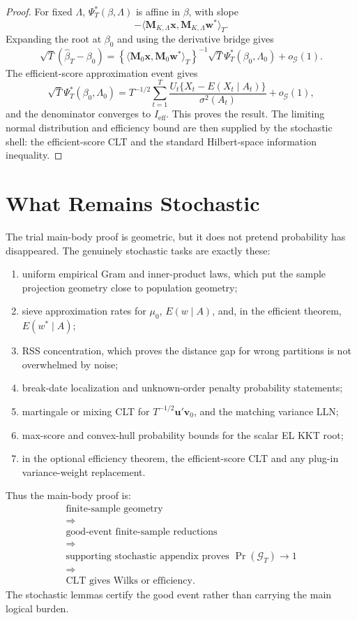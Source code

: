 \documentclass[12pt]{article}
\numberwithin{equation}{section}
\theoremstyle{definition}
\newcommand{\innerT}[2]{\langle #1,#2\rangle_T}
\begin{document}
\begin{proof}
For fixed \(\Lambda\), \(\Psi_T^*(\beta,\Lambda)\) is affine in \(\beta\), with
slope
\[
    -\innerT{\bm M_{K,\Lambda}\bm x}{\bm M_{K,\Lambda}\bm w^*}.
\]
Expanding the root at \(\beta_0\) and using the derivative bridge gives
\[
    \sqrt T(\widehat\beta_T-\beta_0)
    =\left\{\innerT{\bm M_0\bm x}{\bm M_0\bm w^*}\right\}^{-1}
      \sqrt T\Psi_T^*(\beta_0,\Lambda_0)+o_{\mathcal G}(1).
\]
The efficient-score approximation event gives
\[
    \sqrt T\Psi_T^*(\beta_0,\Lambda_0)
    =T^{-1/2}\sum_{t=1}^T
      \frac{U_t\{X_t-E(X_t\mid A_t)\}}{\sigma^2(A_t)}+o_{\mathcal G}(1),
\]
and the denominator converges to \(I_{\mathrm{eff}}\). This proves the result.
The limiting normal distribution and efficiency bound are then supplied by the
stochastic shell: the efficient-score CLT and the standard Hilbert-space
information inequality.
\end{proof}

\section{What Remains Stochastic}

The trial main-body proof is geometric, but it does not pretend probability
has disappeared. The genuinely stochastic tasks are exactly these:
\begin{enumerate}[leftmargin=2em]
\item uniform empirical Gram and inner-product laws, which put the sample
projection geometry close to population geometry;
\item sieve approximation rates for \(\mu_0\), \(E(w\mid A)\), and, in the
efficient theorem, \(E(w^*\mid A)\);
\item RSS concentration, which proves the distance gap for wrong partitions is
not overwhelmed by noise;
\item break-date localization and unknown-order penalty probability statements;
\item martingale or mixing CLT for \(T^{-1/2}\bm u'\bm v_0\), and the matching
variance LLN;
\item max-score and convex-hull probability bounds for the scalar EL KKT root;
\item in the optional efficiency theorem, the efficient-score CLT and any
plug-in variance-weight replacement.
\end{enumerate}

Thus the main-body proof is:
\[
\begin{array}{c}
    \text{finite-sample geometry}\\
    \Longrightarrow\\
    \text{good-event finite-sample reductions}\\
    \Longrightarrow\\
    \text{supporting stochastic appendix proves }\Pr(\mathcal G_T)\to1\\
    \Longrightarrow\\
    \text{CLT gives Wilks or efficiency.}
\end{array}
\]
The stochastic lemmas certify the good event rather than carrying the main logical burden.
\end{document}
